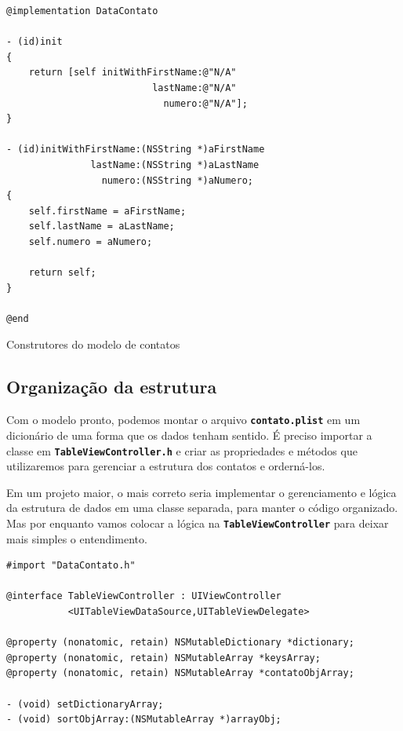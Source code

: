 \documentclass[a4paper,12pt,brazil,doubleside]{book}
\begin{document}
\begin{singlespace}
\begin{listing}[H]
\begin{verbatim}
@implementation DataContato

- (id)init
{
    return [self initWithFirstName:@"N/A"
                          lastName:@"N/A"
                            numero:@"N/A"];
}

- (id)initWithFirstName:(NSString *)aFirstName
               lastName:(NSString *)aLastName
                 numero:(NSString *)aNumero;
{    
    self.firstName = aFirstName;
    self.lastName = aLastName;
    self.numero = aNumero;
    
    return self;
}

@end
\end{verbatim}
\caption{Construtores do modelo de contatos}
\end{listing}

\subsection{Organização da estrutura}


Com o modelo pronto, podemos montar o arquivo \texttt{\textbf{contato.plist}} em um dicionário de uma forma que os dados tenham sentido. É preciso importar a classe em \texttt{\textbf{TableViewController.h}} e criar as propriedades e métodos que utilizaremos para gerenciar a estrutura dos contatos e orderná-los.

Em um projeto maior, o mais correto seria implementar o gerenciamento e lógica da estrutura de dados em uma classe separada, para manter o código organizado. Mas por enquanto vamos colocar a lógica na \texttt{\textbf{TableViewController}} para deixar mais simples o entendimento.

\begin{listing}[H]
\begin{verbatim}
#import "DataContato.h"

@interface TableViewController : UIViewController 
           <UITableViewDataSource,UITableViewDelegate>

@property (nonatomic, retain) NSMutableDictionary *dictionary;
@property (nonatomic, retain) NSMutableArray *keysArray;
@property (nonatomic, retain) NSMutableArray *contatoObjArray;

- (void) setDictionaryArray;
- (void) sortObjArray:(NSMutableArray *)arrayObj;


\end{verbatim}
\end{listing}
\end{singlespace}
\end{document}
